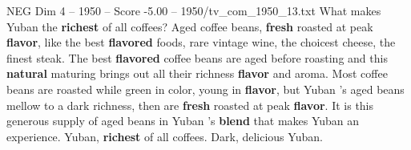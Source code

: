 \begin{textsample}{NEG Dim 4 – 1950 – Score -5.00 – 1950/tv\_com\_1950\_13.txt}  \label{ex:f4_neg_006}
What makes Yuban the \textbf{richest} of all coffees?
Aged coffee beans, \textbf{fresh} roasted at peak \textbf{flavor}, like the best \textbf{flavored} foods, rare vintage wine, the choicest cheese, the finest steak.
The best \textbf{flavored} coffee beans are aged before roasting and this \textbf{natural} maturing brings out all their richness \textbf{flavor} and aroma.
Most coffee beans are roasted while green in color, young in \textbf{flavor}, but Yuban 's aged beans mellow to a dark richness, then are \textbf{fresh} roasted at peak \textbf{flavor}.
It is this generous supply of aged beans in Yuban 's \textbf{blend} that makes Yuban an experience.
Yuban, \textbf{richest} of all coffees.
Dark, delicious Yuban.

\end{textsample}
